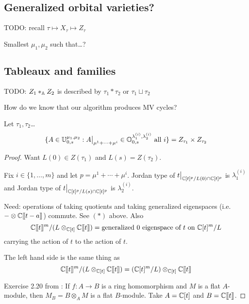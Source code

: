 \documentclass[draft]{article}
\begin{document}

\subsection{Generalized orbital varieties?}
TODO: recall $\tau\mapsto X_\tau \mapsto Z_\tau$

\begin{question}
    Smallest $\mu_1, \mu_2$ such that\dots?
\end{question}

\subsection{Tableaux and families}

TODO: $Z_1\ast_\AA Z_2$ is described by $\tau_1\ast\tau_2$ or $\tau_1\sqcup\tau_2$

\begin{question}
    How do we know that our algorithm produces MV cycles? 
\end{question}

\begin{proposition}
    Let $\tau_1,\tau_2$\dots 
    \[
    \{A\in\UU_{0,s}^{\mu_1,\mu_2} : A \big|_{\mu^1 + \cdots + \mu^i} \in \OO_{0,s}^{\lambda_{1}^{(i)},\lambda_2^{(i)}} \text{ all } i\} = Z_{\tau_1}\times Z_{\tau_2}
    \]
\end{proposition}

\begin{proof}
    Want $L(0) \in Z(\tau_1)$ and $L(s) = Z(\tau_2)$. 

    Fix $i \in \{1,\dots,m\}$ and let $p = \mu^1 + \cdots + \mu^i$. 
    Jordan type of $t\big|_{\CC[t]^p/L(0)\cap\CC[t]^p}$ is $\lambda_1^{(i)}$ and Jordan type of $t\big|_{\CC[t]^p/L(s)\cap \CC[t]^p}$ is $\lambda_2^{(i)}$. 

    Need: operations of taking quotients and taking generalized eigenspaces (i.e.\ $-\otimes\CC\xt[t-a]$) commute.
    See $(*)$ above. Also 
    $$\CC\xt^m/(L \otimes_{\CC[t]} \CC\xt) = \text{generalized $0$ eigenspace of $t$ on } \CC[t]^m/L$$
    carrying the action of $t $ to the action of $t$.
    
    The left hand side is the same thing as
    $$ \CC\xt^m / (L \otimes_{\CC[t]} \CC\xt) = (\CC[t]^m/L) \otimes_{\CC[t]} \CC\xt $$

    Exercise 2.20 from \cite{atiyah2018introduction}: If $f : A \to B$ is a ring homomorphism and $M$ is a flat $A$-module, then $M_B = B\otimes_A M$ is a flat $B$-module. Take $A=\CC[t]$ and $B=\CC\xt$. \marginpar[]{*}
\end{proof}
\end{document}
